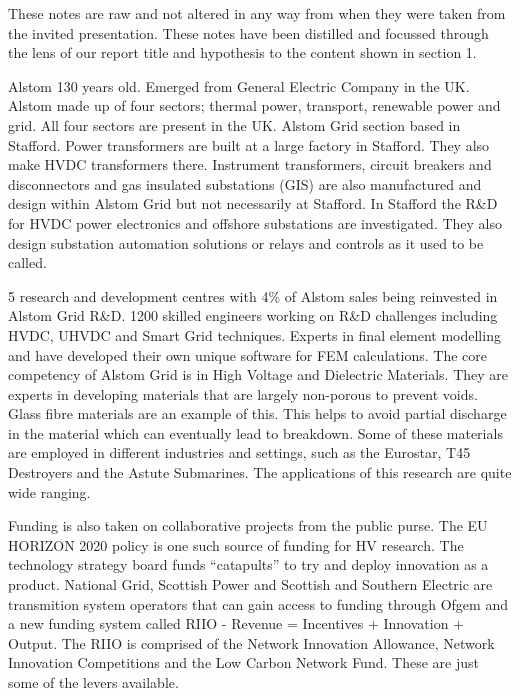 {}
 \label{Notes}
These notes are raw and not altered in any way from when they were taken from the invited presentation. These notes have been distilled and focussed through the lens of our report title and hypothesis to the content shown in section 1.

Alstom 130 years old. 
Emerged from General Electric Company in the UK. 
Alstom made up of four sectors; thermal power, transport, renewable power and grid. 
All four sectors are present in the UK. 
Alstom Grid section based in Stafford. 
Power transformers are built at a large factory in Stafford. 
They also make HVDC transformers there. 
Instrument transformers, circuit breakers and disconnectors and gas insulated substations (GIS) are also manufactured and design within Alstom Grid but not necessarily at Stafford. 
In Stafford the R\&D for HVDC power electronics and offshore substations are investigated. 
They also design substation automation solutions or relays and controls as it used to be called.

5 research and development centres with 4\% of Alstom sales being reinvested in Alstom Grid R\&D. 
1200 skilled engineers working on R\&D challenges including HVDC, UHVDC and Smart Grid techniques. 
Experts in final element modelling and have developed their own unique software for FEM calculations.
The core competency of Alstom Grid is in High Voltage and Dielectric Materials. 
They are experts in developing materials that are largely non-porous to prevent voids. 
Glass fibre materials are an example of this. 
This helps to avoid partial discharge in the material which can eventually lead to breakdown. 
Some of these materials are employed in different industries and settings, such as the Eurostar, T45 Destroyers and the Astute Submarines. 
The applications of this research are quite wide ranging.

Funding is also taken on collaborative projects from the public purse. 
The EU HORIZON 2020 policy is one such source of funding for HV research. 
The technology strategy board funds ``catapults'' to try and deploy innovation as a product. 
National Grid, Scottish Power and Scottish and Southern Electric are transmition system operators that can gain access to funding through Ofgem and a new funding system called RIIO - Revenue = Incentives + Innovation + Output. 
The RIIO is comprised of the Network Innovation Allowance, Network Innovation Competitions and the Low Carbon Network Fund. 
These are just some of the levers available.

